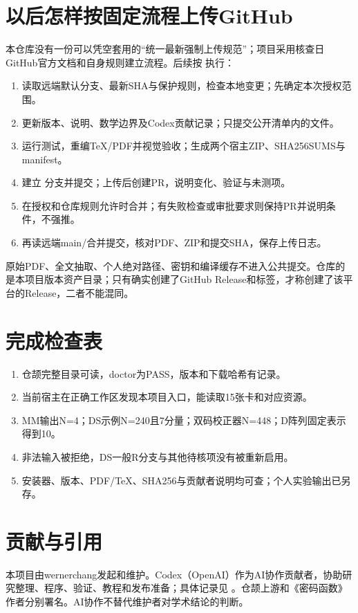 \section{以后怎样按固定流程上传GitHub}
本仓库没有一份可以凭空套用的“统一最新强制上传规范”；项目采用核查日GitHub官方文档和自身规则建立流程\cite{githubpr,githubrelease}。后续按  执行：
\begin{enumerate}
\item 读取远端默认分支、最新SHA与保护规则，检查本地变更；先确定本次授权范围。
\item 更新版本、说明、数学边界及Codex贡献记录；只提交公开清单内的文件。
\item 运行测试，重编TeX/PDF并视觉验收；生成两个宿主ZIP、SHA256SUMS与manifest。
\item 建立  分支并提交；上传后创建PR，说明变化、验证与未测项。
\item 在授权和仓库规则允许时合并；有失败检查或审批要求则保持PR并说明条件，不强推。
\item 再读远端main/合并提交，核对PDF、ZIP和提交SHA，保存上传日志。
\end{enumerate}
原始PDF、全文抽取、个人绝对路径、密钥和编译缓存不进入公共提交。仓库的  是本项目版本资产目录；只有确实创建了GitHub Release和标签，才称创建了该平台的Release，二者不能混同。

\section{完成检查表}
\begin{enumerate}
\item 仓颉完整目录可读，doctor为PASS，版本和下载哈希有记录。
\item 当前宿主在正确工作区发现本项目入口，能读取15张卡和对应资源。
\item MM输出N=4；DS示例N=240且7分量；双码校正器N=448；D阵列固定表示得到10。
\item 非法输入被拒绝，DS一般R分支与其他待核项没有被重新启用。
\item 安装器、版本、PDF/TeX、SHA256与贡献者说明均可查；个人实验输出已另存。
\end{enumerate}

\section*{贡献与引用}
本项目由wernerchang发起和维护。Codex（OpenAI）作为AI协作贡献者，协助研究整理、程序、验证、教程和发布准备；具体记录见 。仓颉上游和《密码函数》作者分别署名。AI协作不替代维护者对学术结论的判断。

